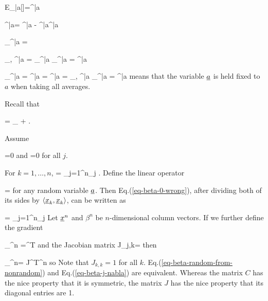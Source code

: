 \beq
E_{|a}[\rvx]=\av{\rvx}^{|a}
\quad{}
\eeq

\beq
\av{\rvx, \rvy}^{|a}=
\av{\rvx\rvy}^{|a}
-
\av{\rvx}^{|a}\av{\rvy}^{|a}
\quad{}
\eeq

\beq
\s_\rvx^{|a} =
\quad {}
\eeq

\beq
\rho_{\rvx, \rvy}^{|a}
=
{\s_\rvx^{|a} \s_\rvy^{|a}}
=
\left[
\frac{\av{\rvx, \rvy}}
{\s_\rvx \s_\rvy}
\right]^{|a}
\quad {}
\eeq

\beq
\partial_\rvx^{|a}\rvy
=
\left[\pder{}{\rvx}\right]^{|a}\rvy
=
{\av{\rvx, \rvx}^{|a}}
=
\rho_{\rvx, \rvy}^{|a}
{\s_\rvx^{|a}}
=
\left[
\rho_{\rvx, \rvy}\frac{
\s_\rvy}
{\s_\rvx}\right]^{|a}
\quad{}
\eeq
{} means that the variable
$\rva$ is held fixed to $a$
when taking all averages.

Recall that

\beq
\rvy =
_{\HAT{\rvy}}
+\ul{\eps}
\;.
\eeq


Assume

\beq
\av{\rveps}=0
\eeq
and
\beq
{}=0
\eeq
for all $j$.

For $k=1, \ldots, n$,
\beq
{}
=
\sum_{j=1}^{n}\beta_j
\;.
\label{eq-beta-0-wrong}
\eeq
Define
the linear operator

\beq
\pder{\cdot}{\rva}=
\frac{\av{\rva, \cdot}}
{\av{\rva, \rva}}
\eeq
for any random variable $\rva$.
Then Eq.(\ref{eq-beta-0-wrong}),
after dividing both
of its sides by $\av{\rvx_k, \rvx_k}$,
can be written as

\beq
{}=
\sum_{j=1}^n\beta_j
\eeq
Let $\rvx^n$ and $\beta^n$ be
$n$-dimensional column vectors.
If we further define
the gradient

\beq
\nabla_{\rvx^n}\rvy
=^T
\eeq
and the Jacobian matrix
\beq
J_{j,k}=
\eeq
then

\beq
\nabla_{\rvx^n}\rvy=
J^T\beta^n
\eeq
so
\beq
{}
\label{eq-beta-j-nabla}
\eeq
Note that $J_{k,k}=1$ for all $k$.
Eq.(\ref{eq-beta-random-from-nonrandom})
and
Eq.(\ref{eq-beta-j-nabla})
are equivalent. Whereas the matrix
$C$ has the nice property
that it is symmetric,
the matrix $J$  has the nice
property that its diagonal
entries are 1.


